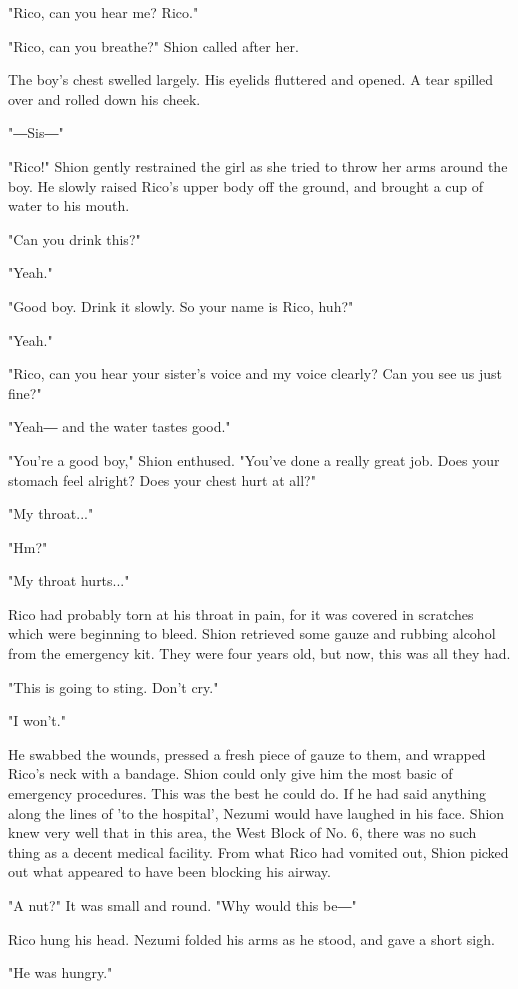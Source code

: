 "Rico, can you hear me? Rico."

"Rico, can you breathe?" Shion called after her.

The boy's chest swelled largely. His eyelids fluttered and opened. A
tear spilled over and rolled down his cheek.

"―Sis―"

"Rico!" Shion gently restrained the girl as she tried to throw her arms
around the boy. He slowly raised Rico's upper body off the ground, and
brought a cup of water to his mouth.

"Can you drink this?"

"Yeah."

"Good boy. Drink it slowly. So your name is Rico, huh?"

"Yeah."

"Rico, can you hear your sister's voice and my voice clearly? Can you
see us just fine?"

"Yeah― and the water tastes good."

"You're a good boy," Shion enthused. "You've done a really great job.
Does your stomach feel alright? Does your chest hurt at all?"

"My throat..."

"Hm?"

"My throat hurts..."

Rico had probably torn at his throat in pain, for it was covered in
scratches which were beginning to bleed. Shion retrieved some gauze and
rubbing alcohol from the emergency kit. They were four years old, but
now, this was all they had.

"This is going to sting. Don't cry."

"I won't."

He swabbed the wounds, pressed a fresh piece of gauze to them, and
wrapped Rico's neck with a bandage. Shion could only give him the most
basic of emergency procedures. This was the best he could do. If he had
said anything along the lines of 'to the hospital', Nezumi would have
laughed in his face. Shion knew very well that in this area, the West
Block of No. 6, there was no such thing as a decent medical facility.
From what Rico had vomited out, Shion picked out what appeared to have
been blocking his airway.

"A nut?" It was small and round. "Why would this be―"

Rico hung his head. Nezumi folded his arms as he stood, and gave a short
sigh.

"He was hungry."

